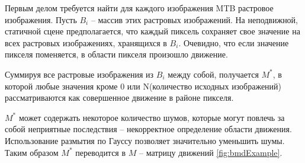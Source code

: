 Первым делом требуется найти для каждого изображения MTB растровое изображения. Пусть $B_i$ -- массив этих растровых изображений. На неподвижной, статичной сцене предполагается, что каждый пиксель сохраняет свое значение на всех растровых изображениях, хранящихся в $B_i$. Очевидно, что если значение пикселя поменяется, в области пикселя произошло движение. 

Суммируя все растровые изображения из $B_i$ между собой, получается $M^*$, в которой любые значения кроме 0 или N(количество исходных изображений) рассматриваются как совершенное движение в районе пикселя. 

$M^*$ может содержать некоторое количество шумов, которые могут повлечь за собой неприятные последствия -- некорректное определение области движения. Использование размытия по Гауссу позволяет значительно уменьшить шумы. Таким образом $M^*$ переводится в $M$ -- матрицу движений \ref{fig:bmdExample}.

